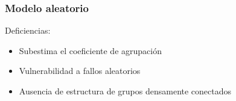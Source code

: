 \documentclass[
10pt, %
aspectratio=169, %
]{beamer}
\begin{document}
\begin{frame}
\begin{minipage}{0.6\textwidth}
		
		\end{minipage}%
		
		
	\end{frame}
	
	\begin{frame}
		
		\frametitle{Modelo aleatorio}
		
		Deficiencias: \\[2mm]
		\begin{itemize}
			\item Subestima el coeficiente de agrupación \\[2mm]
			
			\item Vulnerabilidad a fallos aleatorios \\[2mm]
			
			\item Ausencia de estructura de grupos densamente conectados
			
		\end{itemize}
	
	\end{frame}
	
\end{document}
